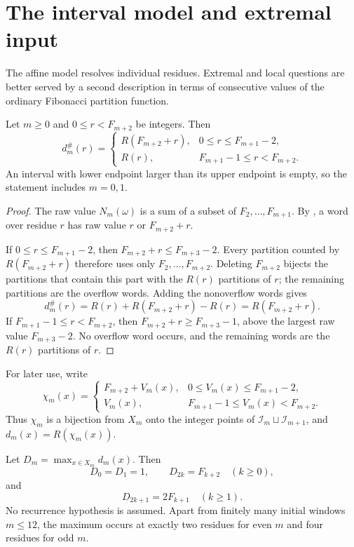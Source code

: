 \section{The interval model and extremal input}
\label{sec:extremal-ldp}

The affine model resolves individual residues.  Extremal and local questions
are better served by a second description in terms of consecutive values of
the ordinary Fibonacci partition function.

\begin{theorem}
\label{thm:fiber-partition-interval}
Let \(m\ge0\) and \(0\le r<F_{m+2}\) be integers.  Then
\[
 d_m^\#(r)=
 \begin{cases}
 R(F_{m+2}+r),&0\le r\le F_{m+1}-2,\\
 R(r),&F_{m+1}-1\le r<F_{m+2}.
 \end{cases}
\]
An interval with lower endpoint larger than its upper endpoint is empty, so
the statement includes \(m=0,1\).
\end{theorem}

\begin{proof}
The raw value \(N_m(\omega)\) is a sum of a subset of
\(F_2,\ldots,F_{m+1}\).  By , a word over residue
\(r\) has raw value \(r\) or \(F_{m+2}+r\).

If \(0\le r\le F_{m+1}-2\), then
\(F_{m+2}+r\le F_{m+3}-2\).  Every partition counted by
\(R(F_{m+2}+r)\) therefore uses only \(F_2,\ldots,F_{m+2}\).  Deleting
\(F_{m+2}\) bijects the partitions that contain this part with the
\(R(r)\) partitions of \(r\); the remaining partitions are the overflow
words.  Adding the nonoverflow words gives
\[
 d_m^\#(r)=R(r)+R(F_{m+2}+r)-R(r)=R(F_{m+2}+r).
\]
If \(F_{m+1}-1\le r<F_{m+2}\), then
\(F_{m+2}+r\ge F_{m+3}-1\), above the largest raw value
\(F_{m+3}-2\).  No overflow word occurs, and the remaining words are the
\(R(r)\) partitions of \(r\).
\end{proof}

For later use, write
\[
 \chi_m(x)=
 \begin{cases}
 F_{m+2}+V_m(x),&0\le V_m(x)\le F_{m+1}-2,\\
 V_m(x),&F_{m+1}-1\le V_m(x)<F_{m+2}.
 \end{cases}
\]
Thus \(\chi_m\) is a bijection from \(X_m\) onto the integer points of
\(\mathcal I_m\sqcup\mathcal I_{m+1}\), and
\(d_m(x)=R(\chi_m(x))\).

\begin{corollary}
\label{cor:unconditional-extremal-fibers}
\label{thm:unconditional-extremal-fibers}
Let \(D_m=\max_{x\in X_m}d_m(x)\).  Then
\[
 D_0=D_1=1,
 \qquad D_{2k}=F_{k+2}\quad(k\ge0),
\]
and
\[
 D_{2k+1}=2F_{k+1}\quad(k\ge1).
\]
No recurrence hypothesis is assumed.  Apart from finitely many initial
windows \(m\le12\), the maximum occurs at exactly two residues for even
\(m\) and four residues for odd \(m\).
\end{corollary}

